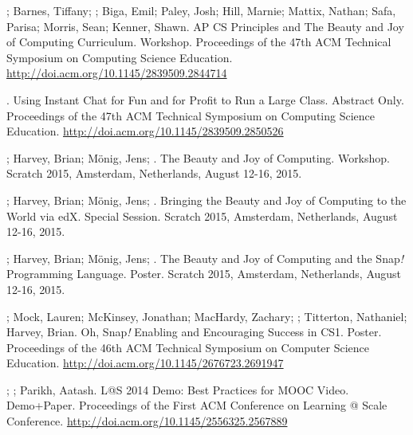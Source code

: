 \begin{etaremune}
    \item{\dan; Barnes, Tiffany; \me; Biga, Emil; Paley, Josh; Hill, Marnie; Mattix, Nathan; Safa, Parisa; Morris, Sean; Kenner, Shawn. AP CS Principles and The Beauty and Joy of Computing Curriculum. Workshop. Proceedings of the 47th ACM Technical Symposium on Computing Science Education.} \href{http://doi.acm.org/10.1145/2839509.2844714}{http://doi.acm.org/10.1145/2839509.2844714}

    \item{\me. Using Instant Chat for Fun and for Profit to Run a Large Class. Abstract Only. Proceedings of the 47th ACM Technical Symposium on Computing Science Education.} \href{http://doi.acm.org/10.1145/2839509.2850526}{http://doi.acm.org/10.1145/2839509.2850526}
    

    \item{\dan; Harvey, Brian; Mönig, Jens; \me. The Beauty and Joy of Computing. Workshop. Scratch 2015, Amsterdam, Netherlands, August 12-16, 2015.}

    \item{\dan; Harvey, Brian; Mönig, Jens; \me. Bringing the Beauty and Joy of Computing to the World via edX. Special Session. Scratch 2015, Amsterdam, Netherlands, August 12-16, 2015.}

    \item{\dan; Harvey, Brian; Mönig, Jens; \me. The Beauty and Joy of Computing and the Snap\textit{!} Programming Language. Poster. Scratch 2015, Amsterdam, Netherlands, August 12-16, 2015.}

    \item{\me; Mock, Lauren; McKinsey, Jonathan; MacHardy, Zachary; \dan; Titterton, Nathaniel; Harvey, Brian. Oh, Snap\textit{!} Enabling and Encouraging Success in CS1. Poster. Proceedings of the 46th ACM Technical Symposium on Computer Science Education.} \newline\href{http://doi.acm.org/10.1145/2676723.2691947}{http://doi.acm.org/10.1145/2676723.2691947}
    

    \item{\dan; \me; Parikh, Aatash. L@S 2014 Demo: Best Practices for MOOC Video. Demo+Paper. Proceedings of the First ACM Conference on Learning @ Scale Conference.} \href{http://doi.acm.org/10.1145/2556325.2567889}{http://doi.acm.org/10.1145/2556325.2567889}

\end{etaremune}
